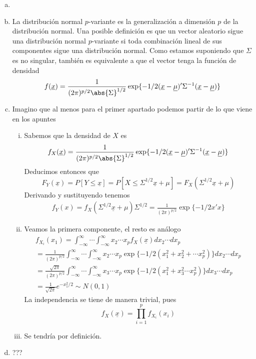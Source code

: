 \documentclass[twoside]{article}
\newcommand{\muestra}[1]{{\underline{#1}}}
\begin{document}
\begin{solucion}
\begin{enumerate}[(a)]
\item[]
\item La distribución normal $p$-variante es la generalización a dimensión $p$ de la distribución normal. Una posible definición es que un vector aleatorio sigue una distribución normal $p$-variante si toda combinación lineal de sus componentes sigue una distribución normal. Como estamos suponiendo que $\Sigma$ es no singular, también es equivalente a que el vector tenga la función de densidad
$$
f(\muestra{x})=\frac{1}{(2\pi)^{p/2}\abs{\Sigma}^{1/2}}\exp\{-1/2(\muestra{x}-\muestra{\mu})'\Sigma^{-1}(\muestra{x}-\muestra{\mu})\}
$$
\item Imagino que al menos para el primer apartado podemos partir de lo que viene en los apuntes
\begin{enumerate}[i.]
\item Sabemos que la densidad de $X$ es
$$
f_X(\muestra{x})=\frac{1}{(2\pi)^{p/2}\abs{\Sigma}^{1/2}}\exp\{-1/2(\muestra{x}-\muestra{\mu})'\Sigma^{-1}(\muestra{x}-\muestra{\mu})\}
$$
Deducimos entonces que
$$
F_Y(\muestra{x})=P[Y\leq \muestra{x}]= P[X\leq \Sigma^{1/2}\muestra x+\mu] = F_X( \Sigma^{1/2}\muestra x+\mu)
$$
Derivando y sustituyendo tenemos
\begin{gather*}
f_Y(x)=f_X(\Sigma^{1/2}\muestra x+\mu)\Sigma^{1/2} = \frac{1}{(2\pi)^{p/2}}\exp\{-1/2x'x\}
\end{gather*}
\item Veamos la primera componente, el resto es análogo
\begin{gather*}
f_{X_i}(x_1)=\int_{-\infty}^\infty \cdots \int_{-\infty}^\infty x_2\cdots x_p f_X(\muestra{x})dx_2\cdots dx_p\\
= \frac{1}{(2\pi)^{p/2}}\int_{-\infty}^\infty \cdots \int_{-\infty}^\infty x_2\cdots x_p\exp\{-1/2(x_1^2+x_2^2+\cdots x_p^2)\}dx_2\cdots dx_p \\
= \frac{\sqrt{2\pi}}{(2\pi)^{p/2}}\int_{-\infty}^\infty \cdots \int_{-\infty}^\infty x_3\cdots x_p\exp\{-1/2(x_1^2+x_3^2\cdots x_p^2)\}dx_3\cdots dx_p \\
= \frac{1}{\sqrt{2\pi}}e^{-x_1^2/2} \sim N(0,1)
\end{gather*}
La independencia se tiene de manera trivial, pues
$$
f_X(\muestra{x})=\prod_{i=1}^p f_{X_i}(x_i)
$$
\item Se tendría por definición.
\end{enumerate}
\item ???

\end{enumerate}
\end{solucion}
\end{document}
